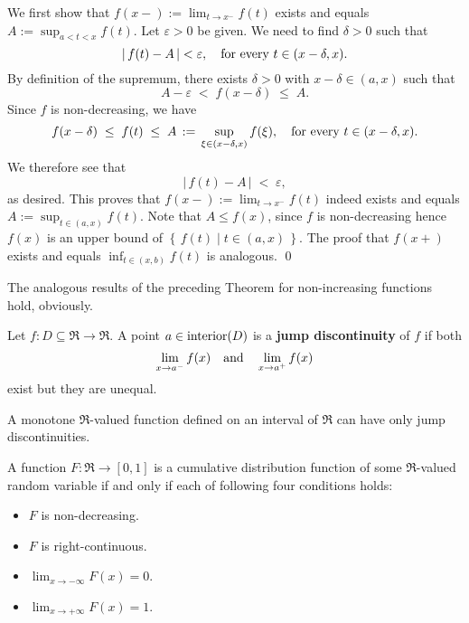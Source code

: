 \proof
We first show that $f(x-) := \lim_{t\rightarrow x^{-}}f(t)$ exists and equals $A := \sup_{a<t<x}f(t)$.
Let $\varepsilon > 0$ be given. We need to find $\delta > 0$ such that
\begin{equation*}
\vert\, f(t) - A \,\vert < \varepsilon,
\quad
\textnormal{for every $t \in (x-\delta,x)$}.
\end{equation*}
By definition of the supremum, there exists $\delta > 0$ with $x-\delta \in (a,x)$ such that
\begin{equation*}
A - \varepsilon \;<\; f(x-\delta) \;\leq\; A.
\end{equation*}
Since $f$ is non-decreasing, we have
\begin{equation*}
f(x-\delta) \; \leq \; f(t) \; \leq \; A \, := \, \sup_{\xi\in(x-\delta,x)}f(\xi),
\quad
\textnormal{for every $t \in (x-\delta,x)$}.
\end{equation*}
We therefore see that
\begin{equation*}
\vert\, f(t) - A \,\vert \; < \; \varepsilon,
\end{equation*}
as desired. This proves that $f(x-) := \lim_{t\rightarrow x^{-}}f(t)$ indeed exists and equals $A := \sup_{t\in(a,x)}f(t)$.
Note that $A \leq f(x)$, since $f$ is non-decreasing hence $f(x)$ is an upper bound of $\left\{\,f(t)\;\vert\; t\in(a,x) \,\right\}$.
The proof that $f(x+)$ exists and equals $\inf_{t\in(x,b)}f(t)$ is analogous.
\qed

\begin{remark}\quad
The analogous results of the preceding Theorem for non-increasing functions hold, obviously.
\end{remark}

\begin{definition}\quad
Let $f : D \subseteq \Re \longrightarrow \Re$.
A point $a \in \textnormal{interior}(D)$ is a \textbf{jump discontinuity} of $f$ if both
\begin{equation*}
\lim_{x \rightarrow a^{-}} f(x)
\quad\textnormal{and}\quad
\lim_{x \rightarrow a^{+}} f(x)
\end{equation*}
exist but they are unequal.
\end{definition}

\begin{corollary}\quad
A monotone $\Re$-valued function defined on an interval of $\Re$ can have only jump discontinuities.
\end{corollary}

\begin{theorem}\label{ThmCharacterizationCDF}\quad
A function $F : \Re \longrightarrow [0,1]$ is a cumulative distribution function of some
$\Re$-valued random variable if and only if each of following four conditions holds:
\begin{itemize}
\item	$F$ is non-decreasing.
\item	$F$ is right-continuous.
\item	$\lim_{x\rightarrow-\infty}F(x) = 0$.
\item	$\lim_{x\rightarrow+\infty}F(x) = 1$.
\end{itemize}
\end{theorem}

